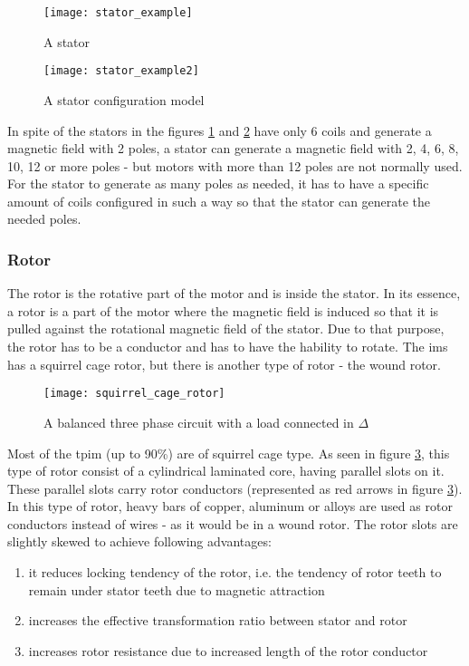 \begin{figure}[htbp]
	\centering
	\texttt{[image: stator\_example]}
	\caption{A stator}
	\label{fig:stator1}
\end{figure}

\begin{figure}[htbp]
	\centering
	\texttt{[image: stator\_example2]}
	\caption{A stator configuration model}
	\label{fig:stator2}
\end{figure}

In spite of the stators in the figures \ref{fig:stator1} and \ref{fig:stator2} have only 6 coils and generate a magnetic field with 2 poles, a stator can generate a magnetic field with 2, 4, 6, 8, 10, 12 or more poles - but motors with more than 12 poles are not normally used. For the stator to generate as many poles as needed, it has to have a specific amount of coils configured in such a way so that the stator can generate the needed poles.


\subsubsection{Rotor}

The rotor is the rotative part of the motor and is inside the stator. In its essence, a rotor is a part of the motor where the magnetic field is induced so that it is pulled against the rotational magnetic field of the stator. Due to that purpose, the rotor has to be a conductor and has to have the hability to rotate.
The \acrshort{ims} has a squirrel cage rotor, but there is another type of rotor - the wound rotor. 

\begin{figure}[htbp]
	\centering
	\texttt{[image: squirrel\_cage\_rotor]}
	\caption{A balanced three phase circuit with a load connected in $\Delta$}
	\label{fig:squirrel_cage_rotor}
\end{figure}

Most of the \acrshort{tpim} (up to 90\%) are of squirrel cage type.
As seen in figure \ref{fig:squirrel_cage_rotor}, this type of rotor consist of a cylindrical laminated core, having parallel slots on it. These parallel slots carry rotor conductors (represented as red arrows in figure \ref{fig:squirrel_cage_rotor}). In this type of rotor, heavy bars of copper, aluminum or alloys are used as rotor conductors instead of wires - as it would be in a wound rotor. 
The rotor slots are slightly skewed to achieve following advantages:
\begin{enumerate}
  \item it reduces locking tendency of the rotor, i.e. the tendency of rotor teeth to remain under stator teeth due to magnetic attraction
  \item increases the effective transformation ratio between stator and rotor
  \item increases rotor resistance due to increased length of the rotor conductor 
\end{enumerate}


